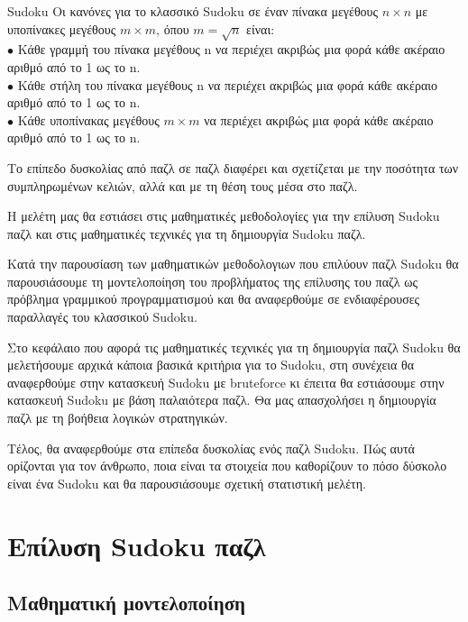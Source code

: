 \documentclass[oneside,12pt]{book}
\theoremstyle{definition}
\begin{document}
\begin{mytheorem}{Sudoku}{}
	Οι κανόνες για το κλασσικό Sudoku σε έναν πίνακα μεγέθους \(n \times n\) με υποπίνακες μεγέθους \(m \times m\), 	όπου \(m = \sqrt{n}\) είναι: \\
	\(\bullet\) Κάθε γραμμή του πίνακα μεγέθους n να περιέχει ακριβώς μια φορά κάθε ακέραιο αριθμό από το 1 ως το n. \\
	\(\bullet\) Κάθε στήλη του πίνακα μεγέθους n να περιέχει ακριβώς μια φορά κάθε ακέραιο αριθμό από το 1 ως το n. \\
	\(\bullet\) Κάθε υποπίνακας μεγέθους \(m \times m\) να περιέχει ακριβώς μια φορά κάθε ακέραιο αριθμό από το 1 ως το n. \\
\end{mytheorem}

Το επίπεδο δυσκολίας από παζλ σε παζλ διαφέρει και σχετίζεται με την ποσότητα των συμπληρωμένων κελιών, αλλά και με τη θέση τους μέσα στο παζλ. \par

Η μελέτη μας θα εστιάσει στις μαθηματικές μεθοδολογίες για την επίλυση Sudoku παζλ και στις μαθηματικές τεχνικές για τη δημιουργία Sudoku παζλ. \par

Κατά την παρουσίαση των μαθηματικών μεθοδολογιων που επιλύουν παζλ Sudoku θα παρουσιάσουμε τη μοντελοποίηση του προβλήματος της επίλυσης του παζλ ως πρόβλημα γραμμικού προγραμματισμού και θα αναφερθούμε σε ενδιαφέρουσες παραλλαγές του κλασσικού Sudoku. \par

Στο κεφάλαιο που αφορά τις μαθηματικές τεχνικές για τη δημιουργία παζλ Sudoku θα μελετήσουμε αρχικά κάποια βασικά κριτήρια για το Sudoku, στη συνέχεια θα αναφερθούμε στην κατασκευή Sudoku με bruteforce κι έπειτα θα εστιάσουμε στην κατασκευή Sudoku με βάση παλαιότερα παζλ. Θα μας απασχολήσει η δημιουργία παζλ με τη βοήθεια λογικών στρατηγικών. \par

Τέλος, θα αναφερθούμε στα επίπεδα δυσκολίας ενός παζλ Sudoku. Πώς αυτά ορίζονται για τον άνθρωπο, ποια είναι τα στοιχεία που καθορίζουν το πόσο δύσκολο είναι ένα Sudoku και θα παρουσιάσουμε σχετική στατιστική μελέτη. \par

\chapter{Επίλυση Sudoku παζλ}
\section{Μαθηματική μοντελοποίηση}
\end{document}
